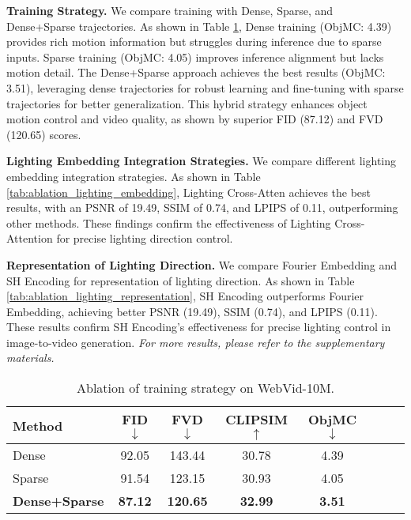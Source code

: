 \noindent\textbf{Training Strategy.}
We compare training with Dense, Sparse, and Dense+Sparse trajectories. As shown in Table \ref{tab:ablation_training_strategy}, Dense training (ObjMC: 4.39) provides rich motion information but struggles during inference due to sparse inputs. Sparse training (ObjMC: 4.05) improves inference alignment but lacks motion detail. The Dense+Sparse approach achieves the best results (ObjMC: 3.51), leveraging dense trajectories for robust learning and fine-tuning with sparse trajectories for better generalization. This hybrid strategy enhances object motion control and video quality, as shown by superior FID (87.12) and FVD (120.65) scores. 

\noindent\textbf{Lighting Embedding Integration Strategies.}
We compare different lighting embedding integration strategies. As shown in Table \ref{tab:ablation_lighting_embedding}, Lighting Cross-Atten achieves the best results, with an PSNR of 19.49, SSIM of 0.74, and LPIPS of 0.11, outperforming other methods. 
These findings confirm the effectiveness of Lighting Cross-Attention for precise lighting direction control.


\noindent\textbf{Representation of Lighting Direction.}
We compare Fourier Embedding \cite{mildenhall2021nerf} and SH Encoding for representation of lighting direction. As shown in Table \ref{tab:ablation_lighting_representation}, SH Encoding outperforms Fourier Embedding, achieving better PSNR (19.49), SSIM (0.74), and LPIPS (0.11). 
These results confirm SH Encoding's effectiveness for precise lighting control in image-to-video generation.
\textit{For more  results, please refer to the supplementary materials.}


\setlength{\tabcolsep}{4pt}
\begin{table}
\vspace{-5pt}
\scriptsize
\centering
\begin{tabular}{lccccccc}
\toprule
\textbf{Method} & FID$\downarrow$    & FVD$\downarrow$    & CLIPSIM$\uparrow$ &  ObjMC$\downarrow$ \\
\midrule
Dense           & 92.05          & 143.44          & 30.78            &  4.39           \\
Sparse          & 91.54          & 123.15          & 30.93            &  4.05           \\
\rowcolor[HTML]{EFEFEF}
\textbf{Dense+Sparse}    & \textbf{87.12} & \textbf{120.65} & \textbf{32.99}   &  \textbf{3.51} \\
\bottomrule
\end{tabular}
\caption{Ablation of training strategy on WebVid-10M.}
\label{tab:ablation_training_strategy}
\vspace{-5pt}
\end{table}




